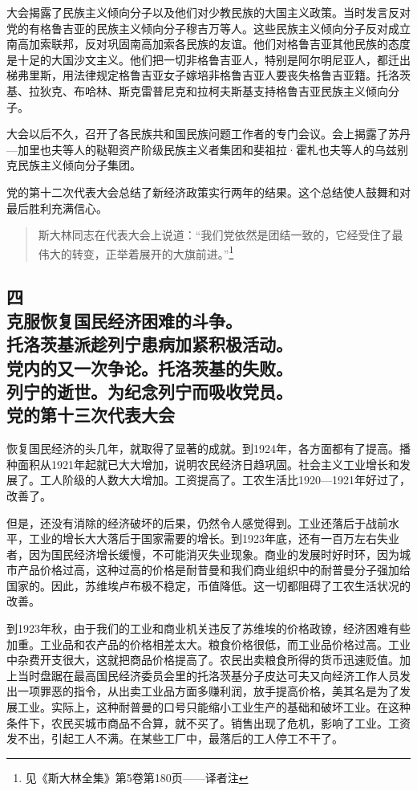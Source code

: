 大会揭露了民族主义倾向分子以及他们对少教民族的大国主义政策。当时发言反对党的有格鲁吉亚的民族主义倾向分子穆吉万等人。这些民族主义倾向分子反对成立南高加索联邦，反对巩固南高加索各民族的友谊。他们对格鲁吉亚其他民族的态度是十足的大国沙文主义。他们把一切非格鲁吉亚人，特别是阿尔明尼亚人，都迁出梯弗里斯，用法律规定格鲁吉亚女子嫁培非格鲁吉亚人要丧失格鲁吉亚籍。托洛茨基、拉狄克、布哈林、斯克雷普尼克和拉柯夫斯基支持格鲁吉亚民族主义倾向分子。

大会以后不久，召开了各民族共和国民族问题工作者的专门会议。会上揭露了苏丹—加里也夫等人的鞑靼资产阶级民族主义者集团和斐祖拉·霍札也夫等人的乌兹别克民族主义倾向分子集团。

党的第十二次代表大会总结了新经济政策实行两年的结果。这个总结使人鼓舞和对最后胜利充满信心。

\begin{quotation}
斯大林同志在代表大会上说道：“我们党依然是团结一致的，它经受住了最伟大的转变，正举着展开的大旗前进。”\footnote{见《斯大林全集》第5卷第180页——译者注}
\end{quotation}


\subsection[四\q 克服恢复国民经济困难的斗争。托洛茨基派趁列宁患病加紧积极活动。党内的又一次争论。托洛茨基的失败。列宁的逝世。为纪念列宁而吸收党员。党的第十三次代表大会]{四\\克服恢复国民经济困难的斗争。\\托洛茨基派趁列宁患病加紧积极活动。\\党内的又一次争论。托洛茨基的失败。\\列宁的逝世。为纪念列宁而吸收党员。\\党的第十三次代表大会}

恢复国民经济的头几年，就取得了显著的成就。到1924年，各方面都有了提高。播种面积从1921年起就已大大增加，说明农民经济日趋巩固。社会主义工业增长和发展了。工人阶级的人数大大增加。工资提高了。工农生活比1920—1921年好过了，改善了。

但是，还没有消除的经济破坏的后果，仍然令人感觉得到。工业还落后于战前水平，工业的增长大大落后于国家需要的增长。到1923年底，还有一百万左右失业者，因为国民经济增长缓慢，不可能消灭失业现象。商业的发展时好时环，因为城市产品价格过高，这种过高的价格是耐昔曼和我们商业组织中的耐普曼分子强加给国家的。因此，苏维埃卢布极不稳定，币值降低。这一切都阻碍了工农生活状况的改善。

到1923年秋，由于我们的工业和商业机关违反了苏维埃的价格政镣，经济困难有些加重。工业品和农产品的价格相差太大。粮食价格很低，而工业品价格过高。工业中杂费开支很大，这就把商品价格提高了。农民出卖粮食所得的货币迅速贬值。加上当时盘踞在最高国民经济委员会里的托洛茨基分子皮达可夫又向经济工作人员发出一项罪恶的指令，从出卖工业品方面多赚利润，放手提高价格，美其名是为了发展工业。实际上，这种耐普曼的口号只能缩小工业生产的基础和破坏工业。在这种条件下，农民买城市商品不合算，就不买了。销售出现了危机，影响了工业。工资发不出，引起工人不满。在某些工厂中，最落后的工人停工不干了。

